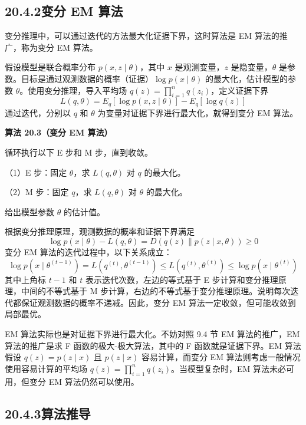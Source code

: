 \documentclass[UTF8,12pt,a4paper,fontset=fandol]{ctexart}
\begin{document}
\subsection*{20.4.2\quad 变分 EM 算法}

变分推理中，可以通过迭代的方法最大化证据下界，这时算法是 EM 算法的推广，称为变分 EM 算法。

假设模型是联合概率分布 $p(x,z\mid\theta)$，其中 $x$ 是观测变量，$z$ 是隐变量，$\theta$ 是参数。目标是通过观测数据的概率（证据）$\log p(x\mid\theta)$ 的最大化，估计模型的参数 $\theta$。使用变分推理，导入平均场 $q(z)=\prod_{i=1}^n q(z_i)$，定义证据下界
\begin{equation}
L(q,\theta)=E_q[\log p(x,z\mid\theta)]-E_q[\log q(z)]
\tag{20.39}
\end{equation}
通过迭代，分别以 $q$ 和 $\theta$ 为变量对证据下界进行最大化，就得到变分 EM 算法。

\noindent\textbf{算法 20.3（变分 EM 算法）}

循环执行以下 E 步和 M 步，直到收敛。

（1）E 步：固定 $\theta$，求 $L(q,\theta)$ 对 $q$ 的最大化。

（2）M 步：固定 $q$，求 $L(q,\theta)$ 对 $\theta$ 的最大化。

给出模型参数 $\theta$ 的估计值。

根据变分推理原理，观测数据的概率和证据下界满足
\begin{equation}
\log p(x\mid\theta)-L(q,\theta)=D(q(z)\|p(z\mid x,\theta))\geq 0
\tag{20.40}
\end{equation}
变分 EM 算法的迭代过程中，以下关系成立：
\begin{equation}
\log p(x\mid\theta^{(t-1)})=L(q^{(t)},\theta^{(t-1)})\leq L(q^{(t)},\theta^{(t)})\leq \log p(x\mid\theta^{(t)})
\tag{20.41}
\end{equation}
其中上角标 $t-1$ 和 $t$ 表示迭代次数，左边的等式基于 E 步计算和变分推理原理，中间的不等式基于 M 步计算，右边的不等式基于变分推理原理。说明每次迭代都保证观测数据的概率不递减。因此，变分 EM 算法一定收敛，但可能收敛到局部最优。

EM 算法实际也是对证据下界进行最大化。不妨对照 9.4 节 EM 算法的推广，EM 算法的推广是求 F 函数的极大-极大算法，其中的 F 函数就是证据下界。EM 算法假设 $q(z)=p(z\mid x)$ 且 $p(z\mid x)$ 容易计算，而变分 EM 算法则考虑一般情况使用容易计算的平均场 $q(z)=\prod_{i=1}^n q(z_i)$。当模型复杂时，EM 算法未必可用，但变分 EM 算法仍然可以使用。

\subsection*{20.4.3\quad 算法推导}
\end{document}
